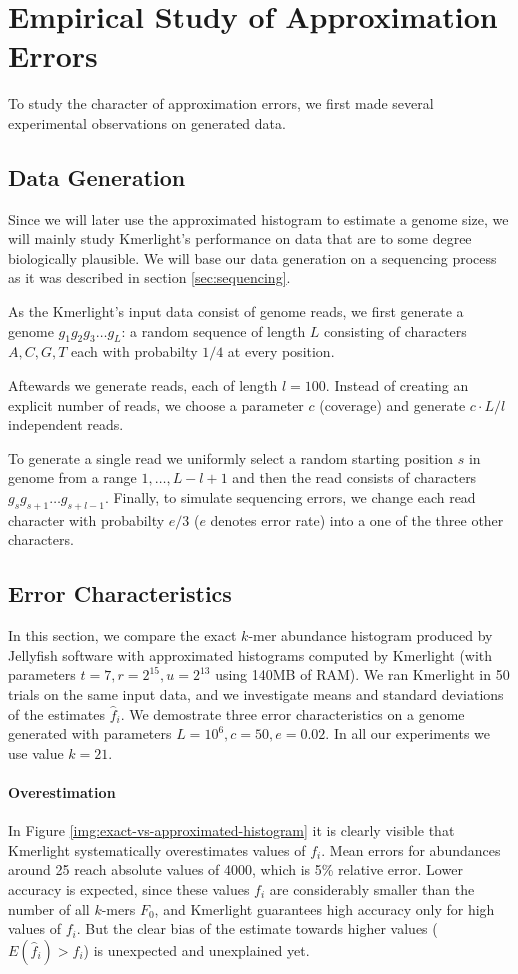 \section{Empirical Study of Approximation Errors}
To study the character of approximation errors, we first made several experimental
observations on generated data.

\subsection{Data Generation}
\label{sec:data-generation}
Since we will later use the approximated histogram to estimate a genome size, 
we will mainly study Kmerlight's performance on data that are to some
degree biologically plausible. We will base our data generation on a sequencing
process as it was described in section \ref{sec:sequencing}.

As the Kmerlight's input data consist of genome reads, we first generate a genome 
$g_1g_2g_3 \dots g_L$: a random sequence of length $L$ consisting of characters $A, C, G, T$ 
each with probabilty $1/4$ at every position.

Aftewards we generate reads, each of length $l=100$. Instead of creating an explicit number
of reads, we choose a parameter $c$ (coverage) and generate $c \cdot L / l$ independent reads.

To generate a single read we uniformly select a random starting position $s$ in genome from
a range $1, \dots, L - l + 1$ and then the read consists of characters
$g_s g_{s+1} \dots g_{s+l-1}$. Finally, to simulate sequencing errors, we change each read
character with probabilty $e/3$ ($e$ denotes error rate) into a one of the three other characters.


\subsection{Error Characteristics}
\label{sec:error-characteristics}
In this section, we compare the exact $k$-mer abundance histogram produced by Jellyfish software
\cite{Marcais2011}
with approximated histograms computed by Kmerlight (with parameters $t=7, r=2^{15}, u=2^{13}$ using
140MB of RAM). We ran Kmerlight in 50 trials on the same input data, and we investigate means and
standard deviations of the estimates $\hat f_i$. We demostrate three error characteristics
on a genome generated with parameters $L=10^6, c=50, e=0.02$. In all our experiments we
use value $k=21$.

\paragraph{Overestimation}
In Figure \ref{img:exact-vs-approximated-histogram} it is clearly visible that Kmerlight
systematically overestimates values of $f_i$. Mean errors for abundances around 25 reach
absolute values of 4000, which is 5\% relative error. Lower accuracy is expected, since these values
$f_i$ are considerably smaller than the number of all $k$-mers $F_0$, and Kmerlight guarantees
high accuracy only for high values of $f_i$. But the clear bias of the estimate towards higher
values ($E(\hat f_i) > f_i$) is unexpected and unexplained yet.  

